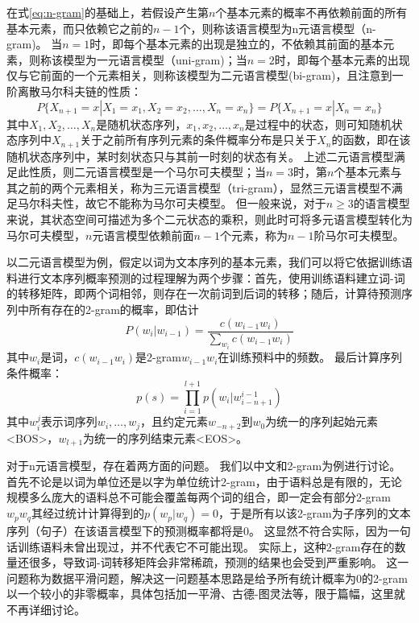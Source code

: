 在式\ref{eq:n-gram}的基础上，若假设产生第$n$个基本元素的概率不再依赖前面的所有基本元素，而只依赖它之前的$n-1$个，则称该语言模型为n元语言模型（n-gram)。
当$n=1$时，即每个基本元素的出现是独立的，不依赖其前面的基本元素，则称该模型为一元语言模型（uni-gram)；当$n=2$时，即每个基本元素的出现仅与它前面的一个元素相关，则称该模型为二元语言模型(bi-gram)，且注意到一阶离散马尔科夫链的性质：
\begin{equation}
    P\{X_{n+1} = x|X_1 = x_1, X_2 = x_2, \dots, X_n = x_n\} = P\{X_{n+1} = x| X_n = x_n\}
\end{equation}
其中$X_1, X_2, \dots , X_n$是随机状态序列，$x_1, x_2, \dots, x_n$是过程中的状态，则可知随机状态序列中$X_{n+1}$关于之前所有序列元素的条件概率分布是只关于${X_n}$的函数，即在该随机状态序列中，某时刻状态只与其前一时刻的状态有关。
上述二元语言模型满足此性质，则二元语言模型是一个马尔可夫模型；当$n=3$时，第$n$个基本元素与其之前的两个元素相关，称为三元语言模型（tri-gram），显然三元语言模型不满足马尔科夫性，故它不能称为马尔可夫模型。
但一般来说，对于$n\geq 3$的语言模型来说，其状态空间可描述为多个二元状态的乘积，则此时可将多元语言模型转化为马尔可夫模型，$n$元语言模型依赖前面$n-1$个元素，称为$n-1$阶马尔可夫模型。

以二元语言模型为例，假定以词为文本序列的基本元素，我们可以将它依据训练语料进行文本序列概率预测的过程理解为两个步骤：首先，使用训练语料建立词-词的转移矩阵，即两个词相邻，则存在一次前词到后词的转移；随后，计算待预测序列中所有存在的2-gram的概率，即估计
\begin{equation}
    P(w_i|w_{i-1}) = \frac{c(w_{i-1}w_i)}{\sum_{w_i}c(w_{i-1}w_i)}
\end{equation}
其中$w_i$是词，$c(w_{i-1}w_i)$是2-gram$w_{i-1}w_i$在训练预料中的频数。
最后计算序列条件概率：
\begin{equation}
    p(s) = \prod_{i=1}^{l+1}p(w_i|w^{i-1}_{i-n+1})
\end{equation}
其中$w^j_i$表示词序列$w_i,\dots,w_j$，且约定元素$w_{-n+2}$到$w_0$为统一的序列起始元素<BOS>，$w_{l+1}$为统一的序列结束元素<EOS>。

对于n元语言模型，存在着两方面的问题。
我们以中文和2-gram为例进行讨论。
首先不论是以词为单位还是以字为单位统计2-gram，由于语料总是有限的，无论规模多么庞大的语料总不可能会覆盖每两个词的组合，即一定会有部分2-gram$w_p w_q$其经过统计计算得到的$p(w_p|w_q)=0$，于是所有以该2-gram为子序列的文本序列（句子）在该语言模型下的预测概率都将是0。
这显然不符合实际，因为一句话训练语料未曾出现过，并不代表它不可能出现。
实际上，这种2-gram存在的数量还很多，导致词-词转移矩阵会非常稀疏，预测的结果也会受到严重影响。
这一问题称为数据平滑问题，解决这一问题基本思路是给予所有统计概率为0的2-gram以一个较小的非零概率，具体包括加一平滑、古德-图灵法等，限于篇幅，这里就不再详细讨论。


